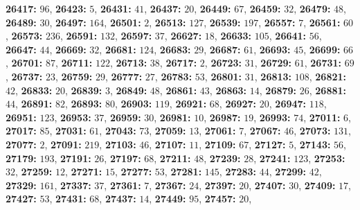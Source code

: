 \textsf{\bfseries 26417:} $96$, \textsf{\bfseries 26423:} $5$, \textsf{\bfseries 26431:} $41$, \textsf{\bfseries 26437:} $20$, \textsf{\bfseries 26449:} $67$, \textsf{\bfseries 26459:} $32$, \textsf{\bfseries 26479:} $48$, \textsf{\bfseries 26489:} $30$, \textsf{\bfseries 26497:} $164$, \textsf{\bfseries 26501:} $2$, \textsf{\bfseries 26513:} $127$, \textsf{\bfseries 26539:} $197$, \textsf{\bfseries 26557:} $7$, \textsf{\bfseries 26561:} $60$, \textsf{\bfseries 26573:} $236$, \textsf{\bfseries 26591:} $132$, \textsf{\bfseries 26597:} $37$, \textsf{\bfseries 26627:} $18$, \textsf{\bfseries 26633:} $105$, \textsf{\bfseries 26641:} $56$, \textsf{\bfseries 26647:} $44$, \textsf{\bfseries 26669:} $32$, \textsf{\bfseries 26681:} $124$, \textsf{\bfseries 26683:} $29$, \textsf{\bfseries 26687:} $61$, \textsf{\bfseries 26693:} $45$, \textsf{\bfseries 26699:} $66$, \textsf{\bfseries 26701:} $87$, \textsf{\bfseries 26711:} $122$, \textsf{\bfseries 26713:} $38$, \textsf{\bfseries 26717:} $2$, \textsf{\bfseries 26723:} $31$, \textsf{\bfseries 26729:} $61$, \textsf{\bfseries 26731:} $69$, \textsf{\bfseries 26737:} $23$, \textsf{\bfseries 26759:} $29$, \textsf{\bfseries 26777:} $27$, \textsf{\bfseries 26783:} $53$, \textsf{\bfseries 26801:} $31$, \textsf{\bfseries 26813:} $108$, \textsf{\bfseries 26821:} $42$, \textsf{\bfseries 26833:} $20$, \textsf{\bfseries 26839:} $3$, \textsf{\bfseries 26849:} $48$, \textsf{\bfseries 26861:} $43$, \textsf{\bfseries 26863:} $14$, \textsf{\bfseries 26879:} $26$, \textsf{\bfseries 26881:} $44$, \textsf{\bfseries 26891:} $82$, \textsf{\bfseries 26893:} $80$, \textsf{\bfseries 26903:} $119$, \textsf{\bfseries 26921:} $68$, \textsf{\bfseries 26927:} $20$, \textsf{\bfseries 26947:} $118$, \textsf{\bfseries 26951:} $123$, \textsf{\bfseries 26953:} $37$, \textsf{\bfseries 26959:} $30$, \textsf{\bfseries 26981:} $10$, \textsf{\bfseries 26987:} $19$, \textsf{\bfseries 26993:} $74$, \textsf{\bfseries 27011:} $6$, \textsf{\bfseries 27017:} $85$, \textsf{\bfseries 27031:} $61$, \textsf{\bfseries 27043:} $73$, \textsf{\bfseries 27059:} $13$, \textsf{\bfseries 27061:} $7$, \textsf{\bfseries 27067:} $46$, \textsf{\bfseries 27073:} $131$, \textsf{\bfseries 27077:} $2$, \textsf{\bfseries 27091:} $219$, \textsf{\bfseries 27103:} $46$, \textsf{\bfseries 27107:} $11$, \textsf{\bfseries 27109:} $67$, \textsf{\bfseries 27127:} $5$, \textsf{\bfseries 27143:} $56$, \textsf{\bfseries 27179:} $193$, \textsf{\bfseries 27191:} $26$, \textsf{\bfseries 27197:} $68$, \textsf{\bfseries 27211:} $48$, \textsf{\bfseries 27239:} $28$, \textsf{\bfseries 27241:} $123$, \textsf{\bfseries 27253:} $32$, \textsf{\bfseries 27259:} $12$, \textsf{\bfseries 27271:} $15$, \textsf{\bfseries 27277:} $53$, \textsf{\bfseries 27281:} $145$, \textsf{\bfseries 27283:} $44$, \textsf{\bfseries 27299:} $42$, \textsf{\bfseries 27329:} $161$, \textsf{\bfseries 27337:} $37$, \textsf{\bfseries 27361:} $7$, \textsf{\bfseries 27367:} $24$, \textsf{\bfseries 27397:} $20$, \textsf{\bfseries 27407:} $30$, \textsf{\bfseries 27409:} $17$, \textsf{\bfseries 27427:} $53$, \textsf{\bfseries 27431:} $68$, \textsf{\bfseries 27437:} $14$, \textsf{\bfseries 27449:} $95$, \textsf{\bfseries 27457:} $20$, 
